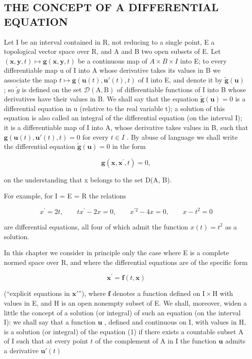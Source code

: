 \subsection{THE CONCEPT OF A DIFFERENTIAL EQUATION}

Let I be an interval contained in R, not reducing to a single point, E a topological vector space over R, and A and B two open subsets of E. Let \((\mathbf{x}, \mathbf{y}, t) \mapsto \mathbf{g}(\mathbf{x}, \mathbf{y}, t)\) be a continuous map of \(A \times B \times I\) into E; to every differentiable map u of I into A whose derivative takes its values in B we associate the map \(t \mapsto \mathbf{g}(\mathbf{u}(t), \mathbf{u}'(t), t)\) of I into E, and denote it by \(\tilde{\mathbf{g}}(\mathbf{u})\) ; so \(\tilde{g}\) is defined on the set \(\mathcal{D}(\mathrm{A}, \mathrm{B})\) of differentiable functions of I into B whose derivatives have their values in B. We shall say that the equation \(\tilde{\mathbf{g}}(\mathbf{u}) = 0\) is a differential equation in u (relative to the real variable t); a solution of this equation is also called an integral of the differential equation (on the interval I); it is a differentiable map of I into A, whose derivative takes values in B, such that \(\mathbf{g}(\mathbf{u}(t), \mathbf{u}'(t), t) = 0\) for every \(t \in I\) . By abuse of language we shall write the differential equation \(\tilde{\mathbf{g}}(\mathbf{u}) = 0\) in the form

\[
\mathbf {g} (\mathbf {x}, \mathbf {x} ^ {\prime}, t) = 0,
\]

on the understanding that x belongs to the set D(A, B).

For example, for I = E = R the relations

\[
x ^ {\prime} = 2 t, \qquad t x ^ {\prime} - 2 x = 0, \qquad x ^ {\prime 2} - 4 x = 0, \qquad x - t ^ {2} = 0
\]

are differential equations, all four of which admit the function \(x(t) = t^{2}\) as a solution.

In this chapter we consider in principle only the case where E is a complete normed space over R, and where the differential equations are of the specific form

\[
\mathbf {x} ^ {\prime} = \mathbf {f} (t, \mathbf {x})\tag{1}
\]

(``explicit equations in \(\mathbf{x}'\)''), where \(\mathbf{f}\) denotes a function defined on \(\mathrm{I} \times \mathrm{H}\) with values in E, and H is an open nonempty subset of E. We shall, moreover, widen a little the concept of a solution (or integral) of such an equation (on the interval I): we shall say that a function \(\mathbf{u}\) , defined and continuous on I, with values in H, is a solution (or integral) of the equation (1) if there exists a countable subset A of I such that at every point \(t\) of the complement of A in I the function \(\mathbf{u}\) admits a derivative \(\mathbf{u}'(t)\)

